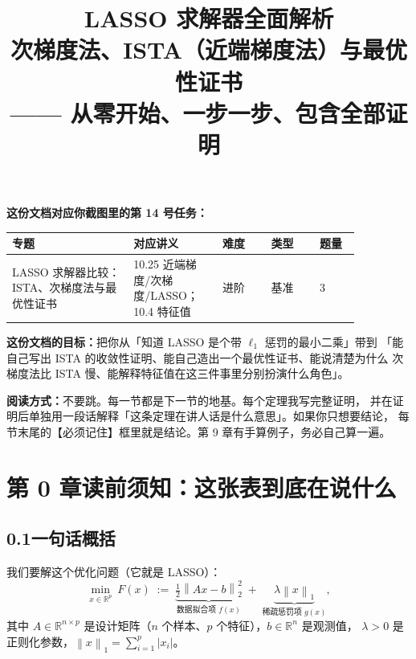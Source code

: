 \documentclass[11pt,a4paper,UTF8]{ctexart}
\title{\bfseries LASSO 求解器全面解析\\[4pt]
\large 次梯度法、ISTA（近端梯度法）与最优性证书\\[2pt]
\normalsize —— 从零开始、一步一步、包含全部证明}
\author{}
\date{}
\theoremstyle{plain}
\theoremstyle{definition}
\theoremstyle{remark}
\newcommand{\R}{\mathbb{R}}
\newcommand{\norm}[1]{\left\lVert #1 \right\rVert}
\newcommand{\abs}[1]{\left\lvert #1 \right\rvert}
\begin{document}
\maketitle

\begin{center}
\begin{minipage}{0.86\linewidth}
\small
\textbf{这份文档对应你截图里的第 14 号任务：}

\begin{center}
\begin{tabular}{@{}p{0.30\linewidth}p{0.22\linewidth}p{0.12\linewidth}p{0.12\linewidth}p{0.10\linewidth}@{}}
\toprule
\textbf{专题} & \textbf{对应讲义} & \textbf{难度} & \textbf{类型} & \textbf{题量}\\
\midrule
LASSO 求解器比较：ISTA、次梯度法与最优性证书 & 10.25 近端梯度/次梯度/LASSO；10.4 特征值 & 进阶 & 基准 & 3\\
\bottomrule
\end{tabular}
\end{center}

\textbf{这份文档的目标：}把你从「知道 LASSO 是个带 $\ell_1$ 惩罚的最小二乘」带到
「能自己写出 ISTA 的收敛性证明、能自己造出一个最优性证书、能说清楚为什么
次梯度法比 ISTA 慢、能解释特征值在这三件事里分别扮演什么角色」。

\medskip
\textbf{阅读方式：}不要跳。每一节都是下一节的地基。每个定理我写完整证明，
并在证明后单独用一段话解释「这条定理在讲人话是什么意思」。如果你只想要结论，
每节末尾的【必须记住】框里就是结论。第 9 章有手算例子，务必自己算一遍。
\end{minipage}
\end{center}

\vspace{1em}

\tableofcontents
\newpage

\section*{第 0 章\quad 读前须知：这张表到底在说什么}

\subsection*{0.1\quad 一句话概括}

我们要解这个优化问题（它就是 LASSO）：
\begin{equation}
\min_{x\in\R^p}\ F(x) \;:=\; \underbrace{\tfrac12\norm{Ax-b}_2^2}_{\text{数据拟合项 } f(x)}
\;+\;\underbrace{\lambda\norm{x}_1}_{\text{稀疏惩罚项 } g(x)},
\label{eq:lasso}
\end{equation}
其中 $A\in\R^{n\times p}$ 是设计矩阵（$n$ 个样本、$p$ 个特征），$b\in\R^n$ 是观测值，
$\lambda>0$ 是正则化参数，$\norm{x}_1=\sum_{i=1}^p\abs{x_i}$。
\end{document}
